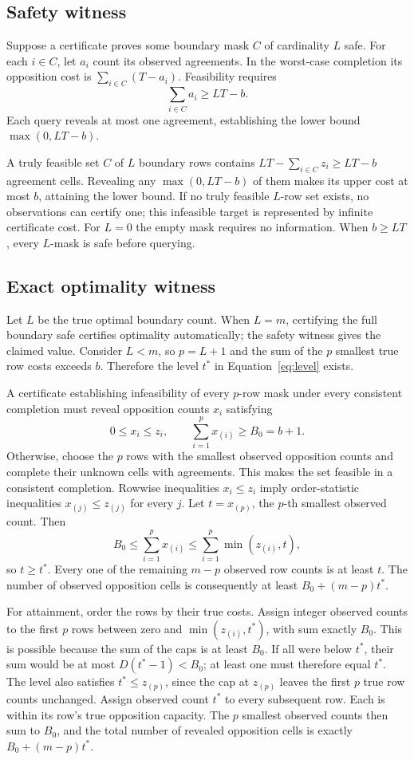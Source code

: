 \subsection{Safety witness}
Suppose a certificate proves some boundary mask $C$ of cardinality $L$ safe. For each $i\in C$, let $a_i$ count its observed agreements. In the worst-case completion its opposition cost is $\sum_{i\in C}(T-a_i)$. Feasibility requires
\[
 \sum_{i\in C}a_i\ge LT-b.
\]
Each query reveals at most one agreement, establishing the lower bound $\max(0,LT-b)$.

A truly feasible set $C$ of $L$ boundary rows contains $LT-\sum_{i\in C}z_i\ge LT-b$ agreement cells. Revealing any $\max(0,LT-b)$ of them makes its upper cost at most $b$, attaining the lower bound. If no truly feasible $L$-row set exists, no observations can certify one; this infeasible target is represented by infinite certificate cost. For $L=0$ the empty mask requires no information. When $b\ge LT$, every $L$-mask is safe before querying.

\subsection{Exact optimality witness}
Let $L$ be the true optimal boundary count. When $L=m$, certifying the full boundary safe certifies optimality automatically; the safety witness gives the claimed value. Consider $L<m$, so $p=L+1$ and the sum of the $p$ smallest true row costs exceeds $b$. Therefore the level $t^*$ in Equation~\ref{eq:level} exists.

A certificate establishing infeasibility of every $p$-row mask under every consistent completion must reveal opposition counts $x_i$ satisfying
\[
 0\le x_i\le z_i,\qquad\sum_{i=1}^{p}x_{(i)}\ge B_0=b+1.
\]
Otherwise, choose the $p$ rows with the smallest observed opposition counts and complete their unknown cells with agreements. This makes the set feasible in a consistent completion. Rowwise inequalities $x_i\le z_i$ imply order-statistic inequalities $x_{(j)}\le z_{(j)}$ for every $j$. Let $t=x_{(p)}$, the $p$-th smallest observed count. Then
\[
 B_0\le\sum_{i=1}^{p}x_{(i)}\le\sum_{i=1}^{p}\min(z_{(i)},t),
\]
so $t\ge t^*$. Every one of the remaining $m-p$ observed row counts is at least $t$. The number of observed opposition cells is consequently at least $B_0+(m-p)t^*$.

For attainment, order the rows by their true costs. Assign integer observed counts to the first $p$ rows between zero and $\min(z_{(i)},t^*)$, with sum exactly $B_0$. This is possible because the sum of the caps is at least $B_0$. If all were below $t^*$, their sum would be at most $D(t^*-1)<B_0$; at least one must therefore equal $t^*$. The level also satisfies $t^*\le z_{(p)}$, since the cap at $z_{(p)}$ leaves the first $p$ true row counts unchanged. Assign observed count $t^*$ to every subsequent row. Each is within its row's true opposition capacity. The $p$ smallest observed counts then sum to $B_0$, and the total number of revealed opposition cells is exactly $B_0+(m-p)t^*$.

